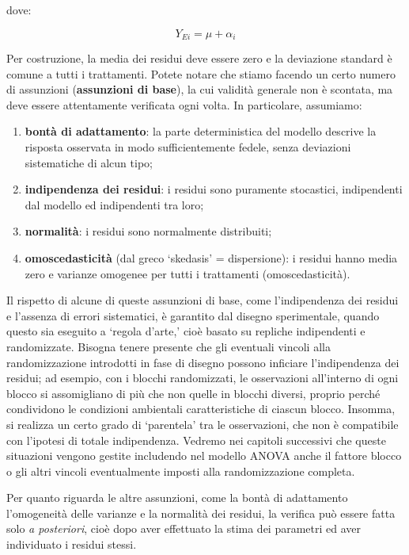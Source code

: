 \documentclass[a4paper,12pt,oneside]{book}
\providecommand{\tightlist}{%
  \setlength{\itemsep}{0pt}\setlength{\parskip}{0pt}}
\begin{document}
dove:

\[Y_{Ei} = \mu + \alpha_i\]

Per costruzione, la media dei residui deve essere zero e la deviazione standard è comune a tutti i trattamenti. Potete notare che stiamo facendo un certo numero di assunzioni (\textbf{assunzioni di base}), la cui validità generale non è scontata, ma deve essere attentamente verificata ogni volta. In particolare, assumiamo:

\begin{enumerate}
\def\labelenumi{\arabic{enumi}.}
\tightlist
\item
  \textbf{bontà di adattamento}: la parte deterministica del modello descrive la risposta osservata in modo sufficientemente fedele, senza deviazioni sistematiche di alcun tipo;
\item
  \textbf{indipendenza dei residui}: i residui sono puramente stocastici, indipendenti dal modello ed indipendenti tra loro;
\item
  \textbf{normalità}: i residui sono normalmente distribuiti;
\item
  \textbf{omoscedasticità} (dal greco `skedasis' = dispersione): i residui hanno media zero e varianze omogenee per tutti i trattamenti (omoscedasticità).
\end{enumerate}

Il rispetto di alcune di queste assunzioni di base, come l'indipendenza dei residui e l'assenza di errori sistematici, è garantito dal disegno sperimentale, quando questo sia eseguito a `regola d'arte,' cioè basato su repliche indipendenti e randomizzate. Bisogna tenere presente che gli eventuali vincoli alla randomizzazione introdotti in fase di disegno possono inficiare l'indipendenza dei residui; ad esempio, con i blocchi randomizzati, le osservazioni all'interno di ogni blocco si assomigliano di più che non quelle in blocchi diversi, proprio perché condividono le condizioni ambientali caratteristiche di ciascun blocco. Insomma, si realizza un certo grado di `parentela' tra le osservazioni, che non è compatibile con l'ipotesi di totale indipendenza. Vedremo nei capitoli successivi che queste situazioni vengono gestite includendo nel modello ANOVA anche il fattore blocco o gli altri vincoli eventualmente imposti alla randomizzazione completa.

Per quanto riguarda le altre assunzioni, come la bontà di adattamento l'omogeneità delle varianze e la normalità dei residui, la verifica può essere fatta solo \emph{a posteriori}, cioè dopo aver effettuato la stima dei parametri ed aver individuato i residui stessi.
\end{document}
